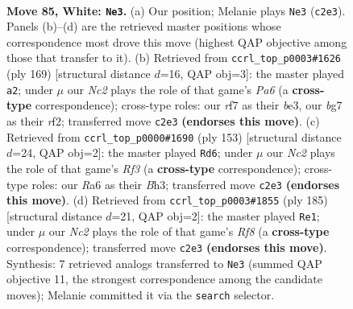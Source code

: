 \documentclass[11pt]{article}
\begin{document}
\clearpage

\begin{figure}[p]\centering
\begin{subfigure}{0.46\textwidth}\centering
\resizebox{\linewidth}{!}{%
\newchessgame
\chessboard[
  setfen={6k1/5rb1/R1P5/1R6/7K/8/2N5/8 w - - 9 85},
  showmover=false,
  pgfstyle=straightmove, color=movearrow, markmove={c2-e3}
]}
\caption{}
\end{subfigure}\hfill
\begin{subfigure}{0.46\textwidth}\centering
\resizebox{\linewidth}{!}{%
\newchessgame
\chessboard[
  setfen={8/8/8/8/4K1k1/p3B3/5R2/r7 b - - 1 85},
  showmover=false,
  pgfstyle=straightmove, color=movearrow, markmove={a3-a2}
]}
\caption{}
\end{subfigure}
\\[4pt]
\begin{subfigure}{0.46\textwidth}\centering
\resizebox{\linewidth}{!}{%
\newchessgame
\chessboard[
  setfen={8/6k1/5r2/4p3/1R6/3BK2b/8/8 b - - 3 77},
  showmover=false,
  pgfstyle=straightmove, color=movearrow, markmove={f6-d6}
]}
\caption{}
\end{subfigure}\hfill
\begin{subfigure}{0.46\textwidth}\centering
\resizebox{\linewidth}{!}{%
\newchessgame
\chessboard[
  setfen={8/4k1p1/R7/4K3/4B3/8/8/5r2 b - - 90 93},
  showmover=false,
  pgfstyle=straightmove, color=movearrow, markmove={f1-e1}
]}
\caption{}
\end{subfigure}
\caption{\textbf{Move 85, White: \texttt{Ne3}.} (a) Our position; Melanie plays \texttt{Ne3} (\texttt{c2e3}). Panels (b)--(d) are the retrieved master positions whose correspondence most drove this move (highest QAP objective among those that transfer to it). (b) Retrieved from \texttt{ccrl\_top\_p0003\#1626} (ply 169) [structural distance $d$=16, QAP obj=3]: the master played \texttt{a2}; under $\mu$ our \emph{Nc2} plays the role of that game's \emph{Pa6} (a \textbf{cross-type} correspondence); cross-type roles: our \emph{r}f7 as their \emph{b}e3, our \emph{b}g7 as their \emph{r}f2; transferred move \texttt{c2e3} \textbf{(endorses this move)}. (c) Retrieved from \texttt{ccrl\_top\_p0000\#1690} (ply 153) [structural distance $d$=24, QAP obj=2]: the master played \texttt{Rd6}; under $\mu$ our \emph{Nc2} plays the role of that game's \emph{Rf3} (a \textbf{cross-type} correspondence); cross-type roles: our \emph{R}a6 as their \emph{B}h3; transferred move \texttt{c2e3} \textbf{(endorses this move)}. (d) Retrieved from \texttt{ccrl\_top\_p0003\#1855} (ply 185) [structural distance $d$=21, QAP obj=2]: the master played \texttt{Re1}; under $\mu$ our \emph{Nc2} plays the role of that game's \emph{Rf8} (a \textbf{cross-type} correspondence); transferred move \texttt{c2e3} \textbf{(endorses this move)}. Synthesis: 7 retrieved analogs transferred to \texttt{Ne3} (summed QAP objective 11, the strongest correspondence among the candidate moves); Melanie committed it via the \texttt{search} selector.}
\label{fig:thought-m168}
\end{figure}
\end{document}
